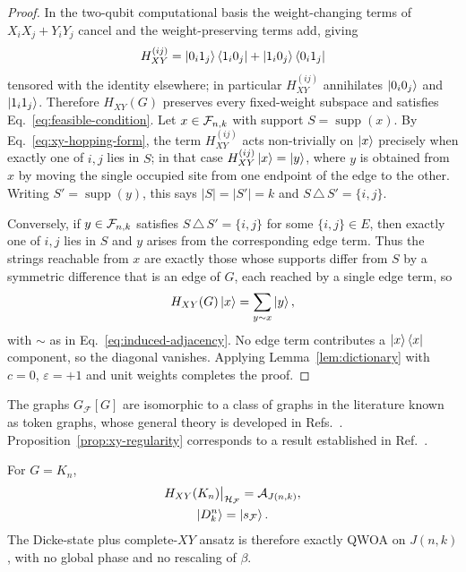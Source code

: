 \begin{proof}
In the two-qubit computational basis the weight-changing terms of
$X_iX_j+Y_iY_j$ cancel and the weight-preserving terms add, giving
\begin{equation}
    H^{(ij)}_{XY}
    =
    \ket{0_i1_j}\bra{1_i0_j}+\ket{1_i0_j}\bra{0_i1_j}
    \label{eq:xy-hopping-form}
\end{equation}
tensored with the identity elsewhere; in particular $H^{(ij)}_{XY}$
annihilates $\ket{0_i0_j}$ and $\ket{1_i1_j}$. Therefore $H_{XY}(G)$ preserves every
fixed-weight subspace and satisfies Eq.~\eqref{eq:feasible-condition}.
Let $x\in\mathcal{F}_{n,k}$ with support $S=\operatorname{supp}(x)$. By
Eq.~\eqref{eq:xy-hopping-form}, the term $H^{(ij)}_{XY}$ acts
non-trivially on $\ket{x}$ precisely when exactly one of $i,j$ lies in
$S$; in that case $H^{(ij)}_{XY}\ket{x}=\ket{y}$, where $y$ is obtained
from $x$ by moving the single occupied site from one endpoint of the edge
to the other. Writing $S'=\operatorname{supp}(y)$, this says $|S|=|S'|=k$
and $S\,\triangle\,S'=\{i,j\}$.

Conversely, if $y\in\mathcal{F}_{n,k}$ satisfies $S\,\triangle\,S'=\{i,j\}$ for
some $\{i,j\}\in E$, then exactly one of $i,j$ lies in $S$ and $y$ arises
from the corresponding edge term. Thus the strings reachable from $x$ are
exactly those whose supports differ from $S$ by a symmetric difference
that is an edge of $G$, each reached by a single edge term, so
\begin{equation}
    H_{XY}(G)\ket{x}=\sum_{y\sim x}\ket{y},
\end{equation}
with $\sim$ as in Eq.~\eqref{eq:induced-adjacency}. No edge term
contributes a $\ket{x}\bra{x}$ component, so the diagonal vanishes.
Applying Lemma~\ref{lem:dictionary} with $c=0$, $\varepsilon=+1$ and unit
weights completes the proof.
\end{proof}

The graphs $G_{\mathcal{F}}[G]$ are isomorphic to a class of graphs in the literature known as token graphs, whose general theory is developed in Refs.~\cite{FabilaMonroy2012Token,Carballosa2017Regularity}. Proposition~\ref{prop:xy-regularity} corresponds to a result established in Ref.~\cite{Carballosa2017Regularity}.

\begin{corollary}
\label{cor:dicke-xy-johnson}
For $G=K_n$,
\begin{equation}
\begin{gathered}
    H_{XY}(K_n)\big|_{\mathcal{H}_{\mathcal{F}}}=\mathcal{A}_{J(n,k)},\\
    \ket{D^n_k}=\ket{s_{\mathcal{F}}} .
\end{gathered}
\end{equation}
The Dicke-state plus complete-$XY$ ansatz is therefore exactly QWOA on
$J(n,k)$, with no global phase and no rescaling of $\beta$.
\end{corollary}

